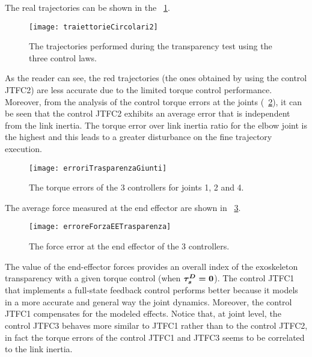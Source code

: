 %
The real trajectories can be shown in the \figurename \ \ref{fig:traittorie3D}.
\begin{figure}[htb]
	\centering
	\texttt{[image: traiettorieCircolari2]}
	\caption{The trajectories performed during the transparency test using the three control laws.}
	\label{fig:traittorie3D}
\end{figure}
%
\par As the reader can see, the red trajectories (the ones obtained by using the control JTFC2) are less accurate due to the limited torque control performance. Moreover, from the analysis of the control torque errors at the joints (\figurename \ \ref{fig:transparencyJointErrors}), it can be seen that the control JTFC2 exhibits an average error that is independent from the link inertia. The torque error over link inertia ratio for the elbow joint is the highest and this leads to a greater disturbance on the fine trajectory execution.
\begin{figure}[htb]
	\centering
	\texttt{[image: erroriTrasparenzaGiunti]}
	\caption{The torque errors of the 3 controllers for joints 1, 2 and 4.}
	\label{fig:transparencyJointErrors}
\end{figure}
%
The average force measured at the end effector are shown in \figurename \ \ref{fig:transparencyEeErrors}.
\begin{figure}[htb]
	\centering
	\texttt{[image: erroreForzaEETrasparenza]}
	\caption{The force error at the end effector of the 3 controllers.}
	\label{fig:transparencyEeErrors}
\end{figure}
%
\par The value of the end-effector forces provides an overall index of the exoskeleton transparency with a given torque control (when ${ \boldsymbol {\tau_s^D=0}}$). The control JTFC1 that implements a full-state feedback control performs better because it models in a more accurate and general way the joint dynamics. Moreover, the control JTFC1 compensates for the modeled effects. Notice that, at joint level, the control JTFC3 behaves more similar to JTFC1 rather than to the control JTFC2, in fact the torque errors of the control JTFC1 and JTFC3 seems to be correlated to the link inertia.

